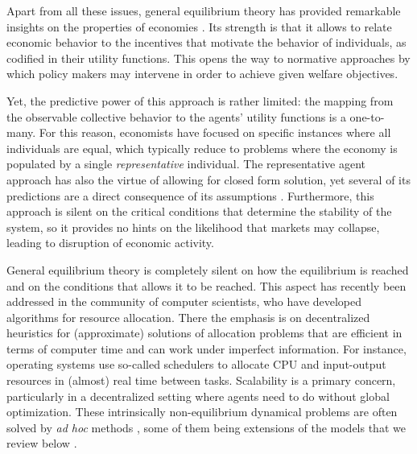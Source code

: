 \documentclass[aps,twocolumn,nofootinbib,sortedaddress,reprint]{revtex4-1}
\begin{document}
Apart from all these issues, general equilibrium theory has provided remarkable insights on the properties of economies \cite{mas1995microeconomic}. Its strength is that it allows to relate economic behavior to the incentives that motivate the behavior of individuals, as codified in their utility functions. This opens the way to normative approaches by which policy makers may intervene in order to achieve given welfare objectives.

Yet, the predictive power of this approach is rather limited: the mapping from the observable collective behavior to the agents' utility functions is a one-to-many. For this reason, economists have focused on specific instances where all individuals are equal, which typically reduce to problems where the economy is populated by a single {\em representative} individual. The representative agent approach has also the virtue of allowing for closed form solution, yet several of its predictions are a direct consequence of its assumptions \cite{kirman1992whom}.
Furthermore, this approach is silent on the critical conditions that determine the stability of the system, so it provides no hints on the likelihood that markets may collapse, leading to disruption of economic activity.

General equilibrium theory is completely silent on how the equilibrium is reached and on the conditions that allows it to be reached. This aspect has recently been addressed in the community of computer scientists, who have developed algorithms for resource allocation. There the emphasis is on decentralized heuristics for (approximate) solutions of allocation problems that are efficient in terms of computer time and can work under imperfect information. For instance, operating systems use so-called schedulers to allocate CPU and input-output resources in (almost) real time between tasks. Scalability is a primary concern, particularly in a
decentralized setting where agents need to do without global
optimization. These intrinsically non-equilibrium dynamical problems
are often solved by \textit{ad hoc} methods \cite{perkins1999adhoc},
some of them being extensions of the models that we review below
\cite{shafique2011minorityCPU}.

\end{document}
